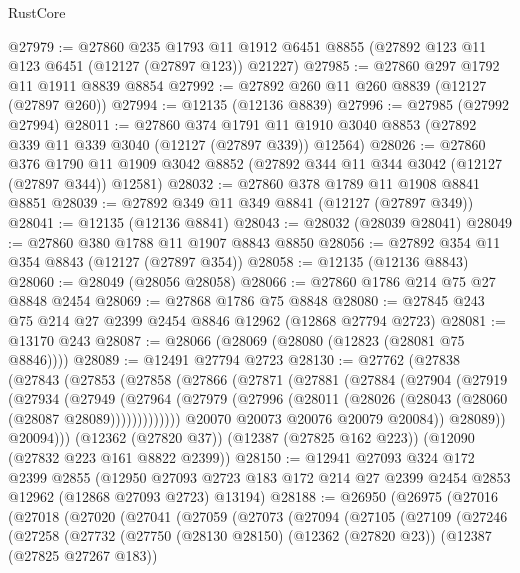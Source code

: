 \begin{lexlean}{RustCore}
\begin{coremodule}
@27979 := @27860
    @235
    @1793
    @11
    @1912
    @6451
    @8855
    (@27892 @123 @11 @123 @6451 (@12127 (@27897 @123)) @21227)
@27985 := @27860 @297 @1792 @11 @1911 @8839 @8854
@27992 := @27892 @260 @11 @260 @8839 (@12127 (@27897 @260))
@27994 := @12135 (@12136 @8839)
@27996 := @27985 (@27992 @27994)
@28011 := @27860
    @374
    @1791
    @11
    @1910
    @3040
    @8853
    (@27892 @339 @11 @339 @3040 (@12127 (@27897 @339)) @12564)
@28026 := @27860
    @376
    @1790
    @11
    @1909
    @3042
    @8852
    (@27892 @344 @11 @344 @3042 (@12127 (@27897 @344)) @12581)
@28032 := @27860 @378 @1789 @11 @1908 @8841 @8851
@28039 := @27892 @349 @11 @349 @8841 (@12127 (@27897 @349))
@28041 := @12135 (@12136 @8841)
@28043 := @28032 (@28039 @28041)
@28049 := @27860 @380 @1788 @11 @1907 @8843 @8850
@28056 := @27892 @354 @11 @354 @8843 (@12127 (@27897 @354))
@28058 := @12135 (@12136 @8843)
@28060 := @28049 (@28056 @28058)
@28066 := @27860 @1786 @214 @75 @27 @8848 @2454
@28069 := @27868 @1786 @75 @8848
@28080 := @27845 @243 @75 @214 @27 @2399 @2454 @8846 @12962 (@12868 @27794 @2723)
@28081 := @13170 @243
@28087 := @28066 (@28069 (@28080 (@12823 (@28081 @75 @8846))))
@28089 := @12491 @27794 @2723
@28130 := @27762
    (@27838
      (@27843
        (@27853
          (@27858
            (@27866
              (@27871
                (@27881
                  (@27884
                    (@27904
                      (@27919
                        (@27934
                          (@27949
                            (@27964
                              (@27979
                                (@27996 (@28011 (@28026 (@28043 (@28060 (@28087 @28089)))))))))))))
                  @20070
                  @20073
                  @20076
                  @20079
                  @20084))
              @28089))
          @20094)))
    (@12362 (@27820 @37))
    (@12387 (@27825 @162 @223))
    (@12090 (@27832 @223 @161 @8822 @2399))
@28150 := @12941
    @27093
    @324
    @172
    @2399
    @2855
    (@12950 @27093 @2723 @183 @172 @214 @27 @2399 @2454 @2853 @12962 (@12868 @27093 @2723) @13194)
@28188 := @26950
    (@26975
      (@27016
        (@27018
          (@27020
            (@27041
              (@27059
                (@27073
                  (@27094
                    (@27105
                      (@27109
                        (@27246
                          (@27258
                            (@27732
                              (@27750
                                (@28130 @28150)
                                (@12362 (@27820 @23))
                                (@12387 (@27825 @27267 @183))

\end{coremodule}
\end{lexlean}
